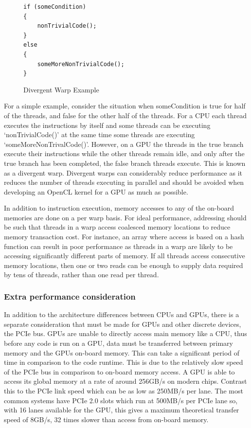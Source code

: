 \begin{figure}[H]
\small\begin{verbatim}
if (someCondition)
{
    nonTrivialCode();
}
else
{
    someMoreNonTrivialCode();
}
\end{verbatim}
\caption{Divergent Warp Example}
\end{figure}

For a simple example, consider the situation when someCondition is true for half
of the threads, and false for the other half of the threads. For a CPU each
thread executes the instructions by itself and some threads can be executing
`nonTrivialCode()' at the same time some threads are executing
`someMoreNonTrivalCode()'. However, on a GPU the threads in the true branch
execute their instructions while the other threads remain idle, and only after
the true branch has been completed, the false branch threads execute. This is
known as a divergent warp. Divergent warps can considerably reduce performance
as it reduces the number of threads executing in parallel and should be avoided
when developing an OpenCL kernel for a GPU as much as possible.

In addition to instruction execution, memory accesses to any of the on-board
memories are done on a per warp basis. For ideal performance, addressing should
be such that threads in a warp access coalesced memory locations to reduce
memory transaction cost. For instance, an array where access is based on a hash
function can result in poor performance as threads in a warp are likely to be
accessing significantly different parts of memory. If all threads access
consecutive memory locations, then one or two reads can be enough to supply data
required by tens of threads, rather than one read per thread.

\subsubsection{Extra performance consideration}

In addition to the architecture differences between CPUs and GPUs, there is a
separate consideration that must be made for GPUs and other discrete devices,
the PCIe bus. GPUs are unable to directly access main memory like a CPU, thus
before any code is run on a GPU, data must be transferred between primary memory
and the GPUs on-board memory. This can take a significant period of time in
comparison to the code runtime. This is due to the relatively slow speed of the
PCIe bus in comparison to on-board memory access. A GPU is able to access its
global memory at a rate of around 256GB/s on modern chips. Contrast this to the
PCIe link speed which can be as low as 250MB/s per lane. The most common systems
have PCIe 2.0 slots which run at 500MB/s per PCIe lane so, with 16 lanes
available for the GPU, this gives a maximum theoretical transfer speed of 8GB/s,
32 times slower than access from on-board memory.

